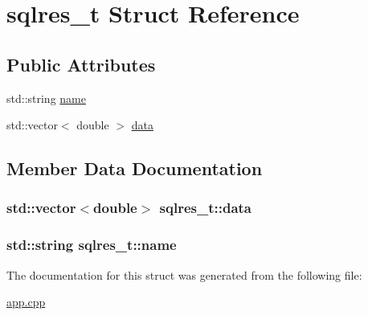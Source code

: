 \hypertarget{structsqlres__t}{}\section{sqlres\+\_\+t Struct Reference}
\label{structsqlres__t}
\subsection*{Public Attributes}
\begin{DoxyCompactItemize}
\item 
std\+::string \hyperlink{structsqlres__t_a5fd587ad37b65ef262075d2d7d8faf9c}{name}
\item 
std\+::vector$<$ double $>$ \hyperlink{structsqlres__t_a122a6417e7ba0b81c2e83f5bbff7a7c1}{data}
\end{DoxyCompactItemize}


\subsection{Member Data Documentation}
\subsubsection[{\texorpdfstring{data}{data}}]{\setlength{\rightskip}{0pt plus 5cm}std\+::vector$<$double$>$ sqlres\+\_\+t\+::data}\hypertarget{structsqlres__t_a122a6417e7ba0b81c2e83f5bbff7a7c1}{}\label{structsqlres__t_a122a6417e7ba0b81c2e83f5bbff7a7c1}
\subsubsection[{\texorpdfstring{name}{name}}]{\setlength{\rightskip}{0pt plus 5cm}std\+::string sqlres\+\_\+t\+::name}\hypertarget{structsqlres__t_a5fd587ad37b65ef262075d2d7d8faf9c}{}\label{structsqlres__t_a5fd587ad37b65ef262075d2d7d8faf9c}


The documentation for this struct was generated from the following file\+:\begin{DoxyCompactItemize}
\item 
\hyperlink{app_8cpp}{app.\+cpp}\end{DoxyCompactItemize}
